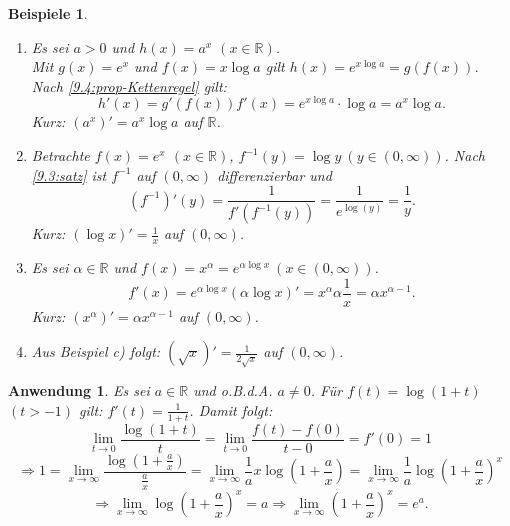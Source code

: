 \documentclass[12pt]{extreport} %
\newcommand{\R}{\mathbb{R}}
\theoremstyle{named}
\theoremstyle{itshape}
\theoremstyle{normal}
\newtheorem{anwendung}[unnamedtheorem]{Anwendung}
\newtheorem*{beispiele}{Beispiele}
\begin{document}
{\begin{beispiele} ~\
	\begin{enumerate}
		\item Es sei $a > 0$ und $h(x) = a^{x}$ $(x \in \R)$. \\
		        Mit $g(x) = e^{x}$ und $f(x) = x \log a$ gilt $h(x)=e^{x \log a} = g(f(x))$. 
		        Nach \ref{9.4:prop-Kettenregel} gilt: 
		        $$h'(x) = g'(f(x)) f'(x) = e^{x \log a} \cdot \log a = a^{x} \log a.$$
		        Kurz: $(a^{x})' = a^{x} \log a$ auf $\R$.
		\item Betrachte $f(x) = e^{x}$ $(x \in \R)$, $f^{-1}(y) = \log y ~(y \in (0, \infty))$. Nach \ref{9.3:satz} ist $f^{-1}$ auf $(0, \infty)$ differenzierbar und
			$$ (f^{-1})'(y) = \frac{1}{f'(f^{-1}(y))} = \frac{1}{e^{\log(y)}} = \frac{1}{y}. $$
			Kurz: $(\log x)' = \frac{1}{x}$ auf $(0, \infty)$.
		\item Es sei $\alpha \in \R$ und $f(x) = x^{\alpha} = e^{\alpha \log x} ~(x \in (0, \infty))$.
			$$ f'(x) = e^{\alpha \log x} (\alpha \log x)' = x^{\alpha} \alpha \frac{1}{x} = \alpha x^{\alpha - 1}. $$
			Kurz: $(x^{\alpha})' = \alpha x^{\alpha - 1}$ auf $(0, \infty)$.
		\item Aus Beispiel c) folgt: $(\sqrt{x})' = \frac{1}{2 \sqrt{x}}$ auf $(0, \infty)$.
	\end{enumerate}
\end{beispiele}


\begin{anwendung} \label{9.5:anwendung}
	Es sei $a \in \R$ und o.B.d.A. $a \neq 0$. Für $f(t) = \log(1 + t)$ $(t > -1)$ gilt: $f'(t) = \frac{1}{1 + t}$. Damit folgt:
	$$ \lim_{t \rightarrow 0}  \frac{\log(1+t)}{t} = \lim_{t \rightarrow 0} \frac{f(t) - f(0)}{t - 0} = f'(0) = 1 $$
	$$ \Rightarrow 1 = \lim_{x \rightarrow \infty} \frac{\log(1 + \frac{a}{x})}{\frac{a}{x}} =  \lim_{x \rightarrow \infty} \frac{1}{a} x \log(1 + \frac{a}{x}) 
	=  \lim_{x \rightarrow \infty} \frac{1}{a} \log (1 + \frac{a}{x})^{x} $$
	$$
	\Rightarrow  \lim_{x \rightarrow \infty} \log (1 + \frac{a}{x})^{x} = a  \Rightarrow \lim_{x \rightarrow \infty} (1 + \frac{a}{x})^{x} = e^{a}.
	$$
\end{anwendung}


}
\end{document}
